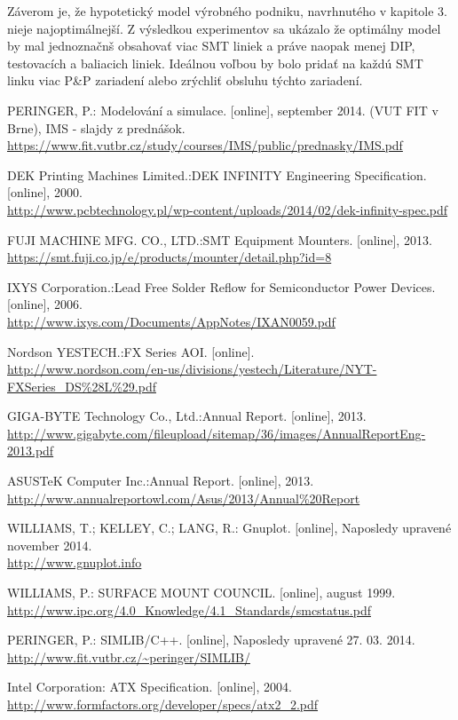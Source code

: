 \documentclass[12pt,a4paper,titlepage,final]{article}
\begin{document}
Záverom je, že hypotetický model výrobného podniku, navrhnutého v kapitole 3. nieje
najoptimálnejší. Z výsledkou experimentov sa ukázalo že optimálny model by mal
jednoznačnš obsahovať viac SMT liniek a práve naopak menej DIP, testovacích a 
baliacich liniek. Ideálnou voľbou by bolo pridať na každú SMT linku viac P\&P zariadení
alebo zrýchliť obsluhu týchto zariadení.


\newpage

\begin{thebibliography}{9}

PERINGER, P.: Modelování a simulace. [online], september 2014. (VUT FIT v Brne), IMS - slajdy z
prednášok.
\\\url{https://www.fit.vutbr.cz/study/courses/IMS/public/prednasky/IMS.pdf}

DEK Printing Machines Limited.:DEK INFINITY Engineering Specification. [online], 2000.
\\\url{http://www.pcbtechnology.pl/wp-content/uploads/2014/02/dek-infinity-spec.pdf}

FUJI MACHINE MFG. CO., LTD.:SMT Equipment Mounters. [online], 2013.
\\\url{https://smt.fuji.co.jp/e/products/mounter/detail.php?id=8}

IXYS Corporation.:Lead Free Solder Reflow for Semiconductor Power Devices. [online], 2006.
\\\url{http://www.ixys.com/Documents/AppNotes/IXAN0059.pdf}

Nordson YESTECH.:FX Series AOI. [online].
\\\url{http://www.nordson.com/en-us/divisions/yestech/Literature/NYT-FXSeries\_DS\%28L\%29.pdf}

GIGA-BYTE Technology Co., Ltd.:Annual Report. [online], 2013.
\\\url{http://www.gigabyte.com/fileupload/sitemap/36/images/AnnualReportEng-2013.pdf}

ASUSTeK Computer Inc.:Annual Report. [online], 2013.
\\\url{http://www.annualreportowl.com/Asus/2013/Annual\%20Report}

WILLIAMS, T.; KELLEY, C.; LANG, R.: Gnuplot. [online], Naposledy upravené november 2014.
\\\url{http://www.gnuplot.info}

WILLIAMS, P.: SURFACE MOUNT COUNCIL. [online], august 1999.
\\\url{http://www.ipc.org/4.0\_Knowledge/4.1\_Standards/smcstatus.pdf}

PERINGER, P.: SIMLIB/C++. [online], Naposledy upravené 27. 03. 2014.
\\\url{http://www.fit.vutbr.cz/~peringer/SIMLIB/}

Intel Corporation: ATX Specification. [online], 2004.
\\\url{http://www.formfactors.org/developer/specs/atx2\_2.pdf}

\end{thebibliography}
\end{document}
